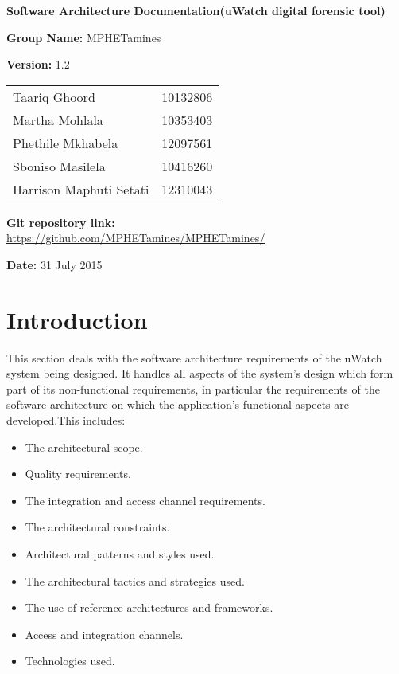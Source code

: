 \documentclass[a4paper,12pt]{article}
\begin{document}
\begin{center}

\Huge\textbf{Software Architecture Documentation(uWatch digital forensic tool)\\}
																											
\vspace{2 cm}

\LARGE\textbf{Group Name:} MPHETamines\newline
 
\LARGE\textbf{Version:} 1.2\newline
 
 
 
 
\vspace{0.5 cm}
\begin{tabular}{lr}
Taariq Ghoord&10132806
\\ 
Martha Mohlala&10353403
\\
Phethile Mkhabela&12097561
\\
Sboniso Masilela&10416260
\\
Harrison Maphuti Setati&12310043\\
\end{tabular}

\vspace{1cm}
\textbf{Git repository link:\\}
\url{https://github.com/MPHETamines/MPHETamines/}

\vspace{1cm}
\textbf{Date:} 31 July 2015
\end{center}
\newpage

\tableofcontents

\newpage
{}

\section{Introduction}
This section deals with the software architecture requirements of the uWatch
system being designed. It handles all aspects of the system's design which
form part of its non-functional requirements, in particular the requirements
of the software architecture on which the application's functional aspects are
developed.This includes:
\begin{itemize}
\item The architectural scope.
\item Quality requirements.
\item The integration and access channel requirements.
\item The architectural constraints.
\item Architectural patterns and styles used.
\item The architectural tactics and strategies used.
\item The use of reference architectures and frameworks.
\item Access and integration channels.
\item Technologies used.
\end{itemize}
\end{document}

